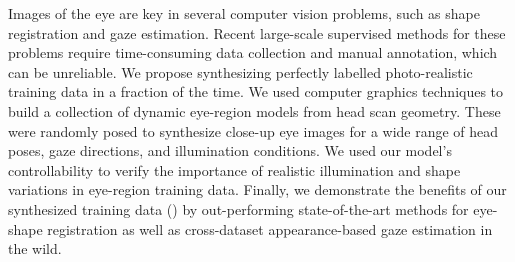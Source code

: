 Images of the eye are key in several computer vision problems, such as shape registration and gaze estimation.
Recent large-scale supervised methods for these problems require time-consuming data collection and manual annotation, which can be unreliable.
We propose synthesizing perfectly labelled photo-realistic training data in a fraction of the time.
We used computer graphics techniques to build a collection of dynamic eye-region models from head scan geometry.
These were randomly posed to synthesize close-up eye images for a wide range of head poses, gaze directions, and illumination conditions.
%
We used our model's controllability to verify the importance of realistic illumination and shape variations in eye-region training data.
%
Finally, we demonstrate the benefits of our synthesized training data (\dataset) by out-performing state-of-the-art methods for eye-shape registration as well as cross-dataset appearance-based gaze estimation in the wild.
